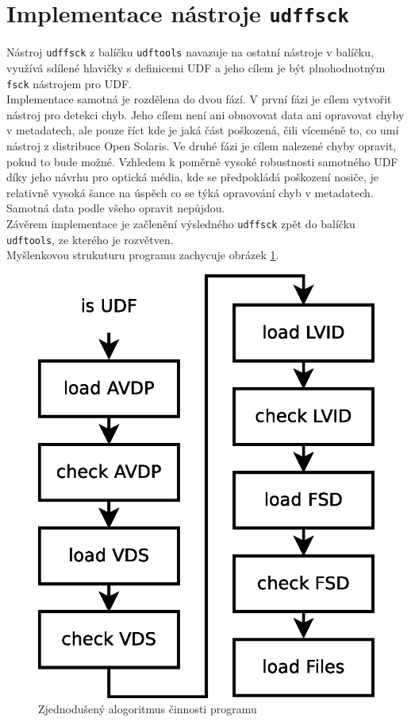 \section{Implementace nástroje \texttt{udffsck}}
Nástroj \texttt{udffsck} z balíčku \texttt{udftools} navazuje na ostatní nástroje v balíčku, využívá sdílené hlavičky s definicemi UDF a jeho cílem je být plnohodnotným \texttt{fsck} nástrojem pro UDF.\\
Implementace samotná je rozdělena do dvou fází. V první fázi je cílem vytvořit nástroj pro detekci chyb. Jeho cílem není ani obnovovat data ani opravovat chyby v metadatech, ale pouze říct kde je jaká část poškozená, čili víceméně to, co umí nástroj z distribuce Open Solaris. Ve druhé fázi je cílem nalezené chyby opravit, pokud to bude možné. Vzhledem k poměrně vysoké robustnosti samotného UDF díky jeho návrhu pro optická média, kde se předpokládá poškození nosiče, je relativně vysoká šance na úspěch co se týká opravování chyb v metadatech. Samotná data podle všeho opravit nepůjdou.\\
Závěrem implementace je začlenění výsledného \texttt{udffsck} zpět do balíčku \texttt{udftools}, ze kterého je rozvětven.\\
Myšlenkovou strukuturu programu zachycuje obrázek \ref{fig:steps1}. 
\begin{figure}[ht] 
    \centering
    \includegraphics[scale=0.4]{obrazky/steps1.eps}
    \caption{Zjednodušený alogoritmus činnosti programu}
    \label{fig:steps1}
\end{figure}

